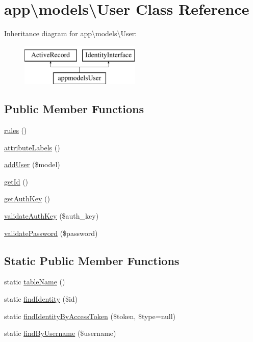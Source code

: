 \hypertarget{classapp_1_1models_1_1User}{}\section{app\textbackslash{}models\textbackslash{}User Class Reference}
\label{classapp_1_1models_1_1User}
Inheritance diagram for app\textbackslash{}models\textbackslash{}User\+:\begin{figure}[H]
\begin{center}
\leavevmode
\includegraphics[height=2.000000cm]{classapp_1_1models_1_1User}
\end{center}
\end{figure}
\subsection*{Public Member Functions}
\begin{DoxyCompactItemize}
\item 
\hyperlink{classapp_1_1models_1_1User_a152870bc0603bd20b958f81a59b55cc4}{rules} ()
\item 
\hyperlink{classapp_1_1models_1_1User_a1a34c854f3c6326db1ebf80c5c6c55f0}{attribute\+Labels} ()
\item 
\hyperlink{classapp_1_1models_1_1User_ab78775bd44a0dbca8a40259c7b031cda}{add\+User} (\$model)
\item 
\hyperlink{classapp_1_1models_1_1User_a58f94c4955db10dd3f24e0a99d00586e}{get\+Id} ()
\item 
\hyperlink{classapp_1_1models_1_1User_a5ced30d7fa2a5dce6de833eb8a1d6d0f}{get\+Auth\+Key} ()
\item 
\hyperlink{classapp_1_1models_1_1User_a171ed47858a8b09e7ce70e73a569e304}{validate\+Auth\+Key} (\$auth\+\_\+key)
\item 
\hyperlink{classapp_1_1models_1_1User_a67d493691bfdc5908a43d7aa768bfb6e}{validate\+Password} (\$password)
\end{DoxyCompactItemize}
\subsection*{Static Public Member Functions}
\begin{DoxyCompactItemize}
\item 
static \hyperlink{classapp_1_1models_1_1User_afda20f0337d04f8ef5111dba15462aed}{table\+Name} ()
\item 
static \hyperlink{classapp_1_1models_1_1User_a25abf1d39633efd5d88a36c714f47ea5}{find\+Identity} (\$id)
\item 
static \hyperlink{classapp_1_1models_1_1User_a84e64540978468a276f7d715e1a9ab58}{find\+Identity\+By\+Access\+Token} (\$token, \$type=null)
\item 
static \hyperlink{classapp_1_1models_1_1User_a0a0594e710a25106fcb110132c9b6f83}{find\+By\+Username} (\$username)
\end{DoxyCompactItemize}


